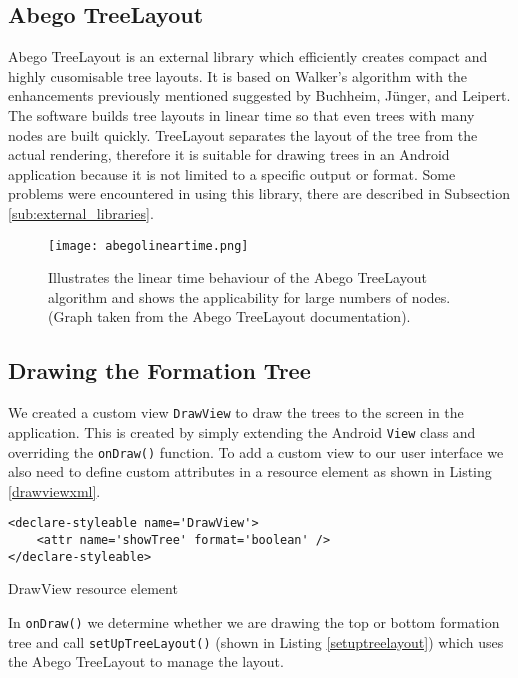 \documentclass{report}
\begin{document}
\subsection{Abego TreeLayout}
\label{sub:abego_treelayout}

Abego TreeLayout is an external library which efficiently creates compact and highly cusomisable tree layouts. It is based on Walker's algorithm with the enhancements previously mentioned suggested by Buchheim, J\"unger, and Leipert\cite{treelayoutlineartime}. The software builds tree layouts in linear time so that even trees with many nodes are built quickly. TreeLayout separates the layout of the tree from the actual rendering, therefore it is suitable for drawing trees in an Android application because it is not limited to a specific output or format. Some problems were encountered in using this library, there are described in Subsection \ref{sub:external_libraries}.

\begin{figure}[ht]
    \centering
    \texttt{[image: abegolineartime.png]}
    \caption{Illustrates the linear time behaviour of the Abego TreeLayout algorithm\cite{abegolineartime} and shows the applicability for large numbers of nodes. (Graph taken from the Abego TreeLayout documentation).}
    \label{abegolineartime}
\end{figure}

\subsection{Drawing the Formation Tree}

We created a custom view {\tt DrawView} to draw the trees to the screen in the application. This is created by simply extending the Android {\tt View} class and overriding the {\tt onDraw()} function. To add a custom view to our user interface we also need to define custom attributes in a resource element as shown in Listing \ref{drawviewxml}.

\begin{listing}[ht!]
\begin{verbatim}
<declare-styleable name='DrawView'>
    <attr name='showTree' format='boolean' />
</declare-styleable>
\end{verbatim}
\caption{DrawView resource element}
\label{drawviewxml}
\end{listing}

In {\tt onDraw()} we determine whether we are drawing the top or bottom formation tree and call {\tt setUpTreeLayout()} (shown in Listing \ref{setuptreelayout}) which uses the Abego TreeLayout to manage the layout.
\end{document}
